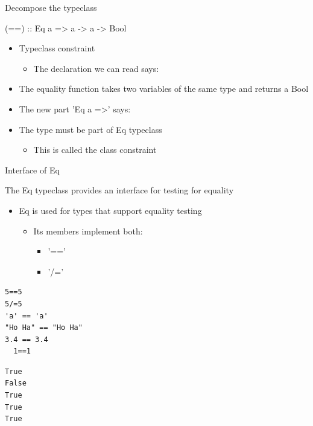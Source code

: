 \documentclass[presetation]{beamer}
\begin{document}
\begin{frame}[label={sec:orgc55fa51}]{Decompose the typeclass}
\begin{block}{(==) :: Eq a => a -> a -> Bool}
\begin{itemize}
\item Typeclass constraint 
\begin{itemize}
\item The declaration we can read says:
\end{itemize}
\end{itemize}
\pause     
\begin{itemize}
\item The equality function takes two variables of the same type and returns a Bool
\end{itemize}
\pause 
\begin{itemize}
\item The new part 'Eq a =>' says:
\item The type must be part of Eq typeclass
\begin{itemize}
\item This is called the class constraint
\end{itemize}
\end{itemize}
\end{block}
\end{frame}
\begin{frame}[fragile,label={sec:org2f51309}]{Interface of Eq}
 \begin{block}{The Eq typeclass provides an interface for testing for equality}
\begin{itemize}
\item Eq is used for types that support equality testing
\begin{itemize}
\item Its members implement both:
\begin{itemize}
\item '=='
\item '/='
\end{itemize}
\end{itemize}
\end{itemize}
\begin{verbatim}
5==5
5/=5
'a' == 'a'
"Ho Ha" == "Ho Ha"
3.4 == 3.4
  1==1
\end{verbatim}

\begin{verbatim}
True
False
True
True
True
\end{verbatim}
\end{block}
\end{frame}
\end{document}
